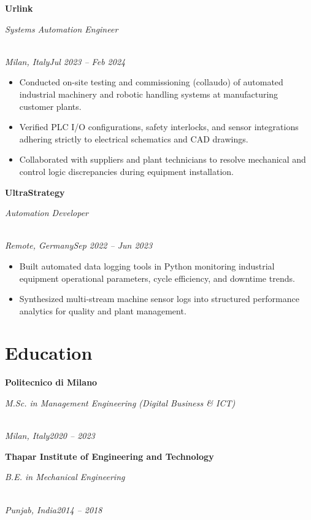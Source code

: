 \documentclass[a4paper,10pt]{article}
\newcommand{\role}[4]{\vspace{3pt}\noindent\hspace{0.6em}\parbox[t]{0.38\textwidth}{\raggedright\textbf{#1}}\hfill\parbox[t]{0.58\textwidth}{\raggedleft\textit{#2}}\\{\textit{#3}\hfill\textit{#4}}\vspace{1pt}}
\begin{document}
\role{Urlink}{Systems Automation Engineer}{Milan, Italy}{Jul 2023 -- Feb 2024}
\begin{itemize}
\item Conducted on-site testing and commissioning (collaudo) of automated industrial machinery and robotic handling systems at manufacturing customer plants.
\item Verified PLC I/O configurations, safety interlocks, and sensor integrations adhering strictly to electrical schematics and CAD drawings.
\item Collaborated with suppliers and plant technicians to resolve mechanical and control logic discrepancies during equipment installation.
\end{itemize}

\role{UltraStrategy}{Automation Developer}{Remote, Germany}{Sep 2022 -- Jun 2023}
\begin{itemize}
\item Built automated data logging tools in Python monitoring industrial equipment operational parameters, cycle efficiency, and downtime trends.
\item Synthesized multi-stream machine sensor logs into structured performance analytics for quality and plant management.
\end{itemize}

\section{Education}
\role{Politecnico di Milano}{M.Sc. in Management Engineering (Digital Business \& ICT)}{Milan, Italy}{2020 -- 2023}
\role{Thapar Institute of Engineering and Technology}{B.E. in Mechanical Engineering}{Punjab, India}{2014 -- 2018}
\end{document}
